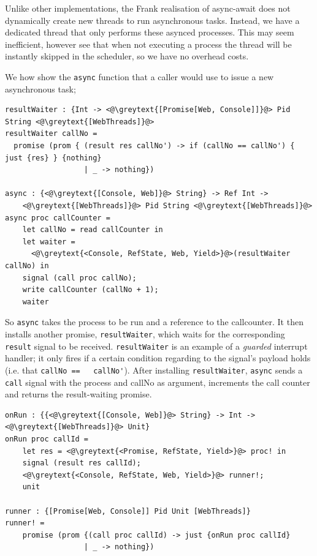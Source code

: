 \documentclass[msc,deptreport,cs]{infthesis} %
\newcommand{\code}[1]{\lstinline{#1}}
\newcommand{\greytext}[1]{\textcolor{black!40}{#1}}
\begin{document}
Unlike other implementations, the Frank realisation of async-await does not
dynamically create new threads to run asynchronous tasks. Instead, we have a
dedicated thread that only performs these asynced processes. This may seem
inefficient, however see that when not executing a process the thread will be
instantly skipped in the scheduler, so we have no overhead costs.

We how show the \code{async} function that a caller would use to issue a new
asynchronous task;

\begin{lstlisting}
resultWaiter : {Int -> <@\greytext{[Promise[Web, Console]]}@> Pid String <@\greytext{[WebThreads]}@>
resultWaiter callNo =
  promise (prom { (result res callNo') -> if (callNo == callNo') { just {res} } {nothing}
                  | _ -> nothing})

async : {<@\greytext{[Console, Web]}@> String} -> Ref Int ->
    <@\greytext{[WebThreads]}@> Pid String <@\greytext{[WebThreads]}@>
async proc callCounter =
    let callNo = read callCounter in
    let waiter =
      <@\greytext{<Console, RefState, Web, Yield>}@>(resultWaiter callNo) in
    signal (call proc callNo);
    write callCounter (callNo + 1);
    waiter
\end{lstlisting}

So \code{async} takes the process to be run and a reference to the callcounter.
It then installs another promise, \code{resultWaiter}, which waits for the
corresponding \code{result} signal to be received. \code{resultWaiter} is an
example of a \emph{guarded} interrupt handler; it only fires if a certain
condition regarding to the signal's payload holds (i.e. that \code{callNo ==
  callNo'}). After installing \code{resultWaiter}, \code{async} sends a
\code{call} signal with the process and callNo as argument, increments the call
counter and returns the result-waiting promise.

\begin{lstlisting}
onRun : {{<@\greytext{[Console, Web]}@> String} -> Int -> <@\greytext{[WebThreads]}@> Unit}
onRun proc callId =
    let res = <@\greytext{<Promise, RefState, Yield>}@> proc! in
    signal (result res callId);
    <@\greytext{<Console, RefState, Web, Yield>}@> runner!;
    unit

runner : {[Promise[Web, Console]] Pid Unit [WebThreads]}
runner! =
    promise (prom {(call proc callId) -> just {onRun proc callId}
                  | _ -> nothing})
\end{lstlisting}
\end{document}
